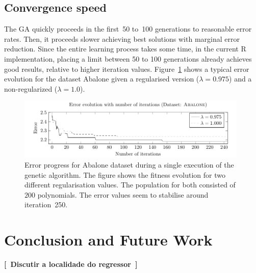 \documentclass[preprint,authoryear,12pt]{elsarticle}
\newcommand{\note}[1]{\textbf{[~#1~]}}
\begin{document}
\subsection{Convergence speed}

The \ac{GA} quickly proceeds in the first~50 to~100 generations to reasonable error rates. Then, it proceeds slower achieving best solutions with marginal error reduction. Since the entire learning process takes some time, in the current R implementation, placing a limit between 50 to 100 generations already achieves good results, relative to higher iteration values. Figure~\ref{Abalone_fitnessProgress} shows a typical error evolution for the dataset Abalone given a regularised version ($\lambda = 0.975$) and a non-regularized ($\lambda = 1.0$).

\begin{figure}[tb]
\begin{center}
\includegraphics[width=0.98\textwidth]{figure_4.pdf}
\caption{Error progress for Abalone dataset during a single execution of the genetic algorithm. The figure shows the fitness evolution for two different regularisation values. The population for both consisted of $200$ polynomials. The error values seem to stabilise around iteration~250.}
\label{Abalone_fitnessProgress}

\end{center}
\end{figure}

\section{Conclusion and Future Work}

\note{Discutir a localidade do regressor}

\end{document}
